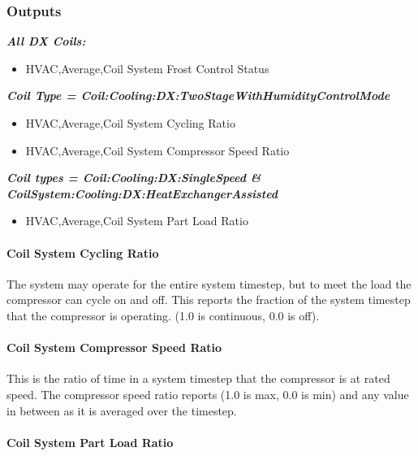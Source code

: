 \subsubsection{Outputs}\label{outputs-19}

\textbf{\emph{All DX Coils:}}

\begin{itemize}
\tightlist
\item
  HVAC,Average,Coil System Frost Control Status
\end{itemize}

\textbf{\emph{Coil Type = Coil:Cooling:DX:TwoStageWithHumidityControlMode}}

\begin{itemize}
\item
  HVAC,Average,Coil System Cycling Ratio
\item
  HVAC,Average,Coil System Compressor Speed Ratio
\end{itemize}

\textbf{\emph{Coil types = Coil:Cooling:DX:SingleSpeed \& CoilSystem:Cooling:DX:HeatExchangerAssisted}}

\begin{itemize}
\tightlist
\item
  HVAC,Average,Coil System Part Load Ratio
\end{itemize}

\paragraph{Coil System Cycling Ratio}\label{coil-system-cycling-ratio}

The system may operate for the entire system timestep, but to meet the load the compressor can cycle on and off. This reports the fraction of the system timestep that the compressor is operating. (1.0 is continuous, 0.0 is off).

\paragraph{Coil System Compressor Speed Ratio}\label{coil-system-compressor-speed-ratio}

This is the ratio of time in a system timestep that the compressor is at rated speed. The compressor speed ratio reports (1.0 is max, 0.0 is min) and any value in between as it is averaged over the timestep.

\paragraph{Coil System Part Load Ratio}\label{coil-system-part-load-ratio}

